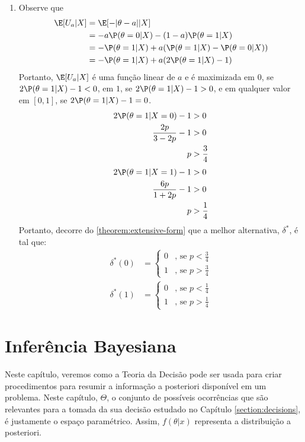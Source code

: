 {\begin{enumerate}[label=(\alph*)]
  \item Observe que
  \begin{align*}
   \E[U_{a}|X]
   &= \E[-|\theta-a||X] \\
   &= -a\P(\theta=0|X) -(1-a)\P(\theta=1|X) \\
   &= -\P(\theta=1|X)
   +a(\P(\theta=1|X)-\P(\theta=0|X)) \\
   &= -\P(\theta=1|X) +a(2\P(\theta=1|X)-1)
  \end{align*}
  Portanto, $\E[U_{a}|X]$ é uma função linear de $a$ e
  é maximizada em $0$, se $2\P(\theta=1|X)-1 < 0$,
  em $1$, se $2\P(\theta=1|X)-1 > 0$, e
  em qualquer valor em $[0,1]$, se 
  $2\P(\theta=1|X)-1=0$.
  \begin{align*}
   2\P(\theta=1|X=0)-1 &> 0 \\
   \frac{2p}{3-2p}-1 &> 0 \\
   p &> \frac{3}{4}
  \end{align*}
  \begin{align*}
   2\P(\theta=1|X=1)-1 &> 0 \\
   \frac{6p}{1+2p}-1 &> 0 \\
   p &> \frac{1}{4}
  \end{align*}
  Portanto, decorre do \cref{theorem:extensive-form} que
  a melhor alternativa, $\delta^{*}$, é tal que:
  \begin{align*}
   \delta^{*}(0) &=
   \begin{cases}
    0 & \text{, se $p < \frac{3}{4}$} \\
    1 & \text{, se $p > \frac{3}{4}$}
   \end{cases}
  \end{align*}
  \begin{align*}
   \delta^{*}(1) &=
   \begin{cases}
    0 & \text{, se $p < \frac{1}{4}$} \\
    1 & \text{, se $p > \frac{1}{4}$}
   \end{cases}
  \end{align*}
 \end{enumerate}
}{}



\section{Inferência Bayesiana}

Neste capítulo, veremos como
a Teoria da Decisão pode ser usada para
criar procedimentos para resumir a informação a posteriori disponível em um problema. Neste capítulo, $\Theta$,
o conjunto de possíveis ocorrências
que são relevantes para a tomada da sua decisão estudado no Capítulo \ref{section:decisions}, é justamente o espaço paramétrico.
Assim, $f(\theta|x)$
representa a distribuição a posteriori.

